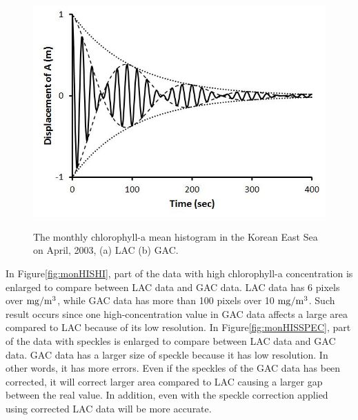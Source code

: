 \begin{figure}[b]
	\centering
	\includegraphics[width=1.0\linewidth]{../images/monHIS}\\
	\caption{The monthly chlorophyll-a mean histogram in the Korean East Sea on April, 2003, (a) LAC (b) GAC.}
	\label{fig:monHIS}
\end{figure}
 
In Figure\ref{fig:monHISHI}, part of the data with high chlorophyll-a concentration is enlarged to compare between LAC data and GAC data. LAC data has 6 pixels over $\rm mg/m^3$, while GAC data has more than 100 pixels over 10 $\rm mg/m^3$. Such result occurs since one high-concentration value in GAC data affects a large area compared to LAC because of its low resolution.
In Figure\ref{fig:monHISSPEC}, part of the data with speckles is enlarged to compare between LAC data and GAC data. GAC data has a larger size of speckle because it has low resolution. In other words, it has more errors. Even if the speckles of the GAC data has been corrected, it will correct larger area compared to LAC causing a larger gap between the real value. In addition, even with the speckle correction applied using corrected LAC data will be more accurate.
    
